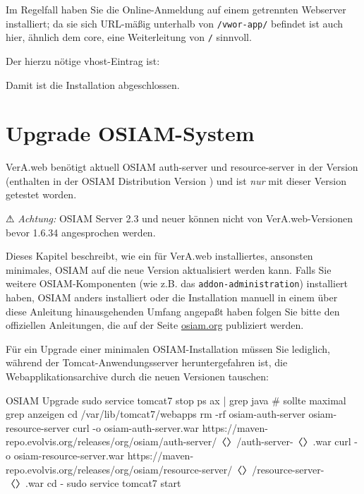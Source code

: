 Im Regelfall haben Sie die Online-Anmeldung auf einem getrennten
Webserver installiert; da sie sich URL-mäßig unterhalb von
\texttt{/vwor-app/} befindet ist auch hier, ähnlich dem core,
eine Weiterleitung von \texttt{/} sinnvoll.

\begin{minipage}{\textwidth}
Der hierzu nötige vhost-Eintrag ist:

\end{minipage}

\fi%

Damit ist die Installation abgeschlossen.

\fi%

\ifoa

\section{Upgrade OSIAM-System}\label{sec:upgrade-osiam}

VerA.web benötigt aktuell OSIAM auth-server und resource-server in
der Version \vwiaversosiam{} (enthalten in der OSIAM Distribution
Version \vwiaversodist{}) und ist \emph{nur} mit dieser Version
getestet worden.\keinumbruch

⚠ \emph{Achtung:} OSIAM Server 2.3 und neuer können nicht von
VerA.web-Versionen bevor 1.6.34 angesprochen werden.

Dieses Kapitel beschreibt, wie ein für VerA.web installiertes,
ansonsten minimales, OSIAM auf die neue Version aktualisiert
werden kann. Falls Sie weitere OSIAM-Komponenten (wie z.B.
das \texttt{addon-administration}) installiert haben, OSIAM
anders installiert oder die Installation manuell in einem
über diese Anleitung hinausgehenden Umfang angepaßt haben
folgen Sie bitte den offiziellen Anleitungen, die auf der
Seite \href{http://osiam.org/}{osiam.org} publiziert werden.

\begin{minipage}{\textwidth}
Für ein Upgrade einer minimalen OSIAM-Installation müssen Sie
lediglich, während der Tomcat-Anwendungsserver heruntergefahren
ist, die Webapplikationsarchive durch die neuen Versionen tauschen:

\begin{lstdump}{OSIAM Upgrade}
sudo service tomcat7 stop
ps ax | grep java # sollte maximal grep anzeigen
cd /var/lib/tomcat7/webapps
rm -rf osiam-auth-server osiam-resource-server
curl -o osiam-auth-server.war https://maven-repo.evolvis.org/releases/org/osiam/auth-server/〈\lstdumpesc{\vwiaversosiam}〉/auth-server-〈\lstdumpesc{\vwiaversosiam}〉.war
curl -o osiam-resource-server.war https://maven-repo.evolvis.org/releases/org/osiam/resource-server/〈\lstdumpesc{\vwiaversosiam}〉/resource-server-〈\lstdumpesc{\vwiaversosiam}〉.war
cd -
sudo service tomcat7 start
\end{lstdump}
\end{minipage}

